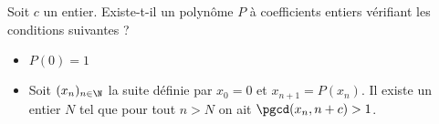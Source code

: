 Soit $c$ un entier. Existe-t-il un polynôme $P$ à coefficients entiers vérifiant les conditions suivantes ?
\begin{itemize}
\item $P(0)=1$
\item Soit $(x_n)_{n\in\N}$ la suite définie par $x_0=0$ et $x_{n + 1} = P(x_n)$. Il existe un entier $N$ tel que pour tout $n > N$ on ait $\pgcd(x_n, n + c) > 1$.
\end{itemize}